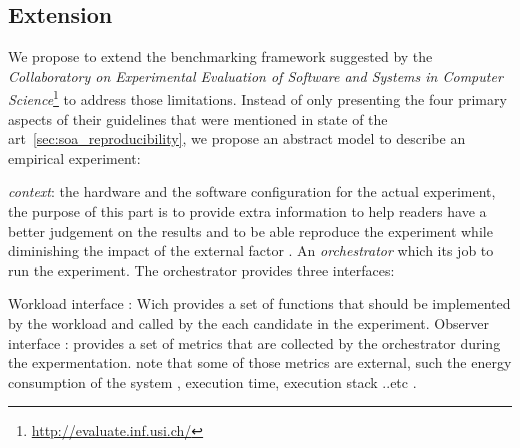 
\subsection{Extension}
We propose to extend the benchmarking framework suggested by the \emph{Collaboratory on Experimental Evaluation of Software and Systems in Computer Science}\footnote{\url{http://evaluate.inf.usi.ch/}} to address those limitations.
Instead of only presenting the four primary aspects of their guidelines that were mentioned in state of the art~\ref{sec:soa_reproducibility}, we propose an abstract model to describe an empirical experiment:

\emph{context}: the hardware and the software configuration for the actual experiment, the purpose of this part is to provide extra information to help readers have a better judgement on the results and to be able reproduce the experiment while diminishing the impact of the external factor . 
An \emph{orchestrator} which its job to run the experiment. 
The orchestrator provides three interfaces: 

Workload interface  : Wich provides a set of functions that should be implemented by the workload  and called by the each candidate in the experiment. 
Observer interface : provides a set of metrics that are collected by the orchestrator during the expermentation. note that some of those metrics are external, such the energy consumption of the system , execution time, execution stack ..etc . 

